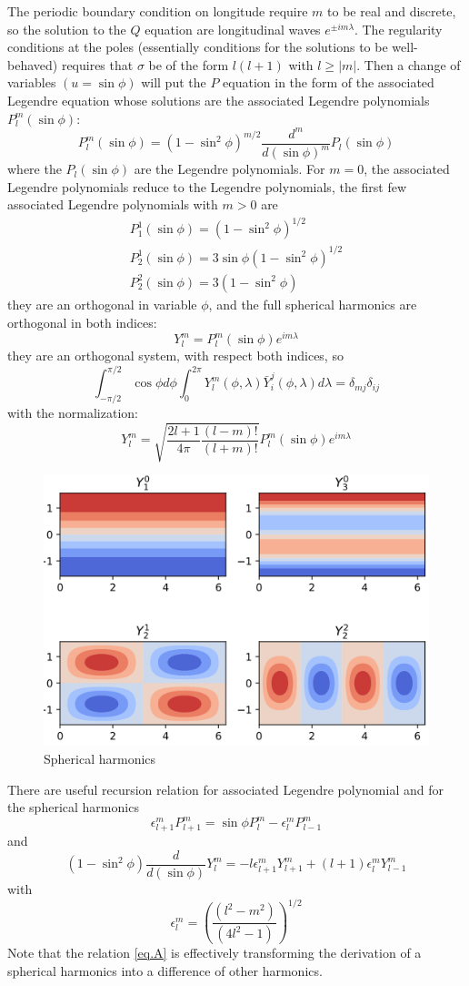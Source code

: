 The periodic boundary condition on longitude require $m$ to be real and discrete, so the solution to the $Q$ equation are longitudinal waves $e^{\pm im\lambda}$. The regularity conditions at the poles (essentially conditions for the solutions to be well-behaved) requires that $\sigma$ be of the form $l(l+1)$ with $l\geq|m|$. Then a change of variables $(u=\sin\phi)$ will put the $P$ equation in the form of the associated Legendre equation whose solutions are the associated Legendre polynomials $P_l^m(\sin\phi)$:
\begin{equation}\label{eq.Legendre polyn}
    P_l^m(\sin\phi)=(1-\sin^2\phi)^{m/2}\frac{d^m}{d(\sin\phi)^m}P_l(\sin\phi)
\end{equation}
where the $P_l(\sin\phi)$ are the Legendre polynomials. For $m=0$, the associated Legendre polynomials reduce to the
Legendre polynomials, the first few associated Legendre
polynomials with $m>0$ are
\begin{align*}
    P_1^1(\sin\phi)=(1-\sin^2\phi)^{1/2}\\
    P_2^1(\sin\phi)=3\sin\phi(1-\sin^2\phi)^{1/2}\\
    P_2^2(\sin\phi)=3(1-\sin^2\phi)
\end{align*}
they are an orthogonal in variable $\phi$, and the full spherical harmonics are orthogonal in both indices: 
\begin{equation}
    Y_l^m=P_l^m(\sin\phi)e^{im\lambda}
\end{equation}
they are an orthogonal system, with respect both indices, so 
\begin{equation}
    \int_{-\pi/2}^{\pi/2}\cos\phi d\phi\int_0^{2\pi}Y_l^m(\phi,\lambda)\bar{Y}_i^j(\phi,\lambda)d\lambda=\delta_{mj}\delta_{ij}
\end{equation}
with the normalization: 
$$Y_l^m=\sqrt{\frac{2l+1}{4\pi}\frac{(l-m)!}{(l+m)!}}P_l^m(\sin\phi)e^{im\lambda}$$
\begin{figure}[h]
    \centering
    \includegraphics[width=0.5\linewidth]{uploads/Screenshot 2024-11-17 201945.png}
    \caption{Spherical harmonics}
    \label{fig:spherical harmonics}
\end{figure}
There are useful recursion relation for associated Legendre
polynomial and for the spherical harmonics
$$\epsilon_{l+1}^mP_{l+1}^m=\sin\phi P^m_l-\epsilon_l^mP^m_{l-1}$$
and 
\begin{equation}\label{eq.A}
    (1-\sin^2\phi)\frac{d}{d(\sin\phi)}Y_l^m=-l\epsilon_{l+1}^mY_{l+1}^m+(l+1)\epsilon_l^mY_{l-1}^m
\end{equation}
with 
$$\epsilon_l^m=\left(\frac{(l^2-m^2)}{(4l^2-1)}\right)^{1/2}$$
Note that the relation \ref{eq.A} is effectively transforming the derivation of a spherical harmonics into a difference of other harmonics.



